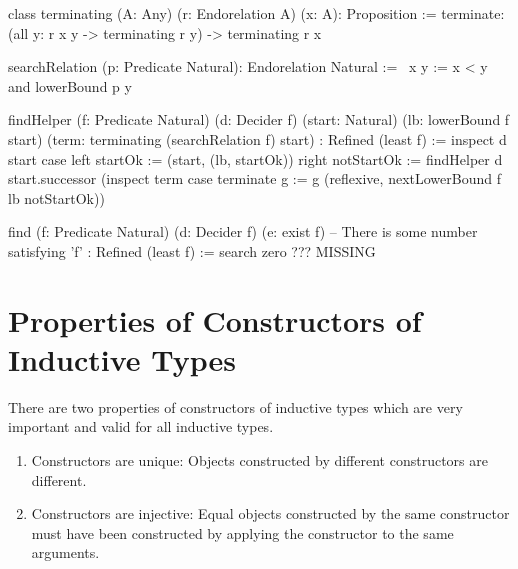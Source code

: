 \begin{alba}
    class terminating (A: Any) (r: Endorelation A) (x: A): Proposition :=
        terminate: (all y: r x y -> terminating r y) -> terminating r x
\end{alba}


\begin{alba}
    searchRelation (p: Predicate Natural): Endorelation Natural :=
        \ x y := x < y and lowerBound p y
\end{alba}


\begin{alba}
    findHelper
        (f: Predicate Natural)
        (d: Decider f)
        (start: Natural)
        (lb: lowerBound f start)
        (term: terminating (searchRelation f) start)
        : Refined (least f)
    :=
        inspect d start case
            left startOk :=
                (start, (lb, startOk))
            right notStartOk :=
                findHelper
                    d
                    start.successor
                    (inspect term case
                        terminate g :=
                            g (reflexive, nextLowerBound f lb notStartOk))


    find
        (f: Predicate Natural)
        (d: Decider f)
        (e: exist f)        -- There is some number satisfying 'f'
        : Refined (least f)
    :=
        search zero ???
        MISSING
\end{alba}



\vskip 5mm
\section{Properties of Constructors of Inductive Types}

There are two properties of constructors of inductive types which are very
important and valid for all inductive types.

\begin{enumerate}

\item Constructors are unique: Objects constructed by
different constructors are different.

\item Constructors are injective: Equal objects constructed by the same
constructor must have been constructed by applying the constructor to the same
arguments.

\end{enumerate}

